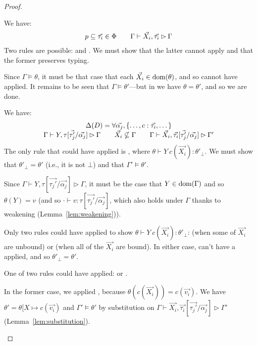 \documentclass[acmsmall,screen,nonacm]{acmart}
\theoremstyle{definition}
\begin{document}
\begin{lemma}
\begin{proof}
\begin{proofcases}
  \item[(\rn{$P$-NegAtom})] We have:
%
  \[ \begin{array}{c}
      p \subseteq \vec{\tau_i} \in \Phi \quad\quad
      \Gamma \vdash \vec{X_i}, \vec{\tau_i} \rhd \Gamma
  \end{array} \]
%
  Two rules are possible:  and . We must
  show that the latter cannot apply and that the former preserves
  typing.

  Since $\Gamma \models \theta$, it must be that case that each
  $\vec{X_i} \in \mathrm{dom}(\theta)$, and so  cannot have
  applied.
%
  It remains to be seen that $\Gamma \models \theta'$---but
  in  we have $\theta = \theta'$, and so we are done.

  \item[(\rn{$P$-EqCtor-BF})] We have:
%
  \[ \begin{array}{c}
    \Delta(D) = \forall \vec{\alpha_j}, \{ \dots, c : \vec{\tau_i}, \dots \} \\
    \Gamma \vdash Y, \tau[\vec{\tau_j'}/\vec{\alpha_j}] \rhd \Gamma \quad\quad
    \vec{X_i} \nsubseteq \Gamma \quad\quad
    \Gamma \vdash \vec{X_i}, \vec{\tau_i}[\vec{\tau_j'}/\vec{\alpha_j}] \rhd \Gamma'
  \end{array} \]
%
  The only rule that could have applied is , where
  $\theta \vdash Y ~ c(\vec{X_i}) : \theta'_\bot$. We must show that
  $\theta'_\bot = \theta'$ (i.e., it is not $\bot$) and that
  $\Gamma' \models \theta'$.

  Since $\Gamma \vdash
  Y, \tau[\vec{\tau_j'}/\vec{\alpha_j}] \rhd \Gamma$, it must be the
  case that $Y \in \mathrm{dom}(\Gamma)$ and so $\theta(Y) = v$ (and so
  $\cdot \vdash v : \tau[\vec{\tau_j'}/\vec{\alpha_j}]$, which also
  holds under $\Gamma$ thanks to weakening
  (Lemma~\ref{lem:weakening})).

  Only two rules could have applied to show $\theta \vdash Y ~
  c(\vec{X_i}) : \theta'_\bot$:  (when some of $\vec{X_i}$
  are unbound) or  (when all of the $\vec{X_i}$ are
  bound). In either case,  can't have a applied, and so
  $\theta'_\bot = \theta'$.

  One of two rules could have applied: 
  or . 

  In the former case, we applied , because
  $\theta(c(\vec{X_i})) = c(\vec{v_i})$. We have $\theta'
  = \theta[X \mapsto c(\vec{v_i})$ and $\Gamma' \models \theta'$ by
  substitution on
  $\Gamma \vdash \vec{X_i}, \vec{\tau_i}[\vec{\tau_j'}/\vec{\alpha_j}] \rhd \Gamma'$
  (Lemma~\ref{lem:substitution}).


\end{proofcases}
\end{proof}
\end{lemma}
\end{document}
